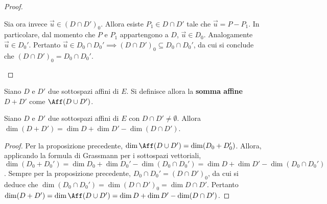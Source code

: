 \documentclass[11pt]{article}
\begin{document}
\begin{proof}
\begin{enumerate}[(i)]
			Sia ora invece $\vec u \in (D \cap D')_0$. Allora esiste $P_1 \in D \cap D'$ tale che
			$\vec u = P - P_1$. In particolare, dal momento che $P$ e $P_1$ appartengono a $D$,
			$\vec u \in D_0$. Analogamente $\vec u \in D_0'$. Pertanto $\vec u \in D_0 \cap D_0' \implies
			(D \cap D')_0 \subseteq D_0 \cap D_0'$, da cui si conclude che $(D \cap D')_0 = D_0 \cap D_0'$. \qedhere
		\end{enumerate}
	\end{proof}

	\begin{definition} 
		Siano $D$ e $D'$ due sottospazi affini di $E$. Si definisce
		allora la \textbf{somma affine} $D + D'$ come $\Aff(D \cup D')$.
	\end{definition}
	
	\begin{proposition} 
		Siano $D$ e $D'$ due sottospazi affini di $E$ con $D \cap D' \neq \emptyset$. Allora
		$\dim (D + D') = \dim D + \dim D' - \dim (D \cap D')$.
	\end{proposition}
	
	\begin{proof}
		Per la proposizione precedente, $\dim \Aff(D \cup D') = \dim (D_0 + D_0')$. Allora, applicando
		la formula di Grassmann per i sottospazi vettoriali, $\dim (D_0 + D_0') = \dim D_0 + \dim D_0' - \dim (D_0 \cap D_0') = \dim D + \dim D' - \dim (D_0 \cap D_0')$. Sempre per la proposizione precedente,
		$D_0 \cap D_0' = (D \cap D')_0$, da cui si deduce che $\dim (D_0 \cap D_0') = \dim (D \cap D')_0 = \dim D \cap D'$. Pertanto $\dim (D + D') = \dim \Aff(D \cup D') = \dim D + \dim D' - \dim (D \cap D')$.
	\end{proof}
\end{document}
